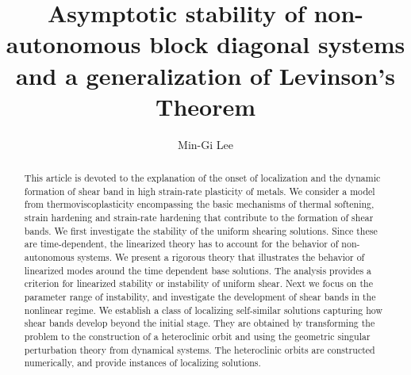 \documentclass[a4paper,11pt]{article}
\newcounter{Theorem}
\theoremstyle{remark}
\begin{document}
\title{Asymptotic stability of non-autonomous block diagonal systems and a generalization of Levinson's Theorem}
\author{Min-Gi Lee\footnotemark[1]}
\date{}

\maketitle
\renewcommand{\thefootnote}{\fnsymbol{footnote}}
\renewcommand{\thefootnote}{\arabic{footnote}}

 \begin{abstract}
 This article is devoted to the explanation of the onset of localization and the dynamic formation of shear band in high strain-rate plasticity of metals.
 We consider a model from thermoviscoplasticity encompassing the basic mechanisms of thermal softening, strain hardening and strain-rate hardening
 that contribute to the formation of shear bands. We first investigate the stability of the uniform shearing solutions.
 Since these are time-dependent, the linearized theory has to account for the behavior of  non-autonomous systems.
 We present a rigorous theory that illustrates the behavior of  linearized modes around the time dependent base solutions.
 The analysis provides a criterion for linearized stability or instability of uniform shear. Next we focus on the parameter range of instability,
 and investigate the development of shear bands in the nonlinear regime. We establish a class of localizing self-similar solutions
 capturing  how shear bands develop beyond the initial stage. They are obtained by transforming the problem to the construction
 of a heteroclinic orbit and using the geometric singular perturbation theory from dynamical systems.
 The heteroclinic orbits are constructed numerically, and provide instances of  localizing solutions.
 \end{abstract}



\vfil\eject
\end{document}
